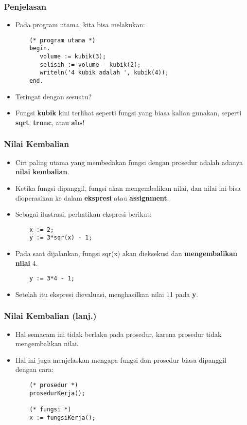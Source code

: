 \documentclass{beamer}
\begin{document}
\begin{frame}[fragile]
\frametitle{Penjelasan}
\begin{itemize}
    \item Pada program utama, kita bisa melakukan:
    \begin{lstlisting}
    (* program utama *)
    begin.
       volume := kubik(3);
       selisih := volume - kubik(2);
       writeln('4 kubik adalah ', kubik(4));
    end.
    \end{lstlisting}
    \item Teringat dengan sesuatu?
    \item Fungsi \textbf{kubik} kini terlihat seperti fungsi yang biasa kalian gunakan, seperti \textbf{sqrt}, \textbf{trunc}, atau \textbf{abs}!
\end{itemize}
\end{frame}

\begin{frame}[fragile]
\frametitle{Nilai Kembalian}
\begin{itemize}
    \item Ciri paling utama yang membedakan fungsi dengan prosedur adalah adanya \textbf{nilai kembalian}.
    \item Ketika fungsi dipanggil, fungsi akan mengembalikan nilai, dan nilai ini bisa dioperasikan ke dalam \textbf{ekspresi} atau \textbf{assignment}.
    \item Sebagai ilustrasi, perhatikan ekspresi berikut:
    \begin{lstlisting}
    x := 2;
    y := 3*sqr(x) - 1;
    \end{lstlisting}
    \item Pada saat dijalankan, fungsi sqr(x) akan dieksekusi dan \textbf{mengembalikan nilai} 4.
    \begin{lstlisting}
    y := 3*4 - 1;
    \end{lstlisting}
    \item Setelah itu ekspresi dievaluasi, menghasilkan nilai 11 pada \textbf{y}.
\end{itemize}
\end{frame}

\begin{frame}[fragile]
\frametitle{Nilai Kembalian (lanj.)}
\begin{itemize}
    \item Hal semacam ini tidak berlaku pada prosedur, karena prosedur tidak mengembalikan nilai.
    \item Hal ini juga menjelaskan mengapa fungsi dan prosedur biasa dipanggil dengan cara:
    \begin{lstlisting}
    (* prosedur *)
    prosedurKerja();

    (* fungsi *)
    x := fungsiKerja();
    \end{lstlisting}
\end{itemize}
\end{frame}
\end{document}
